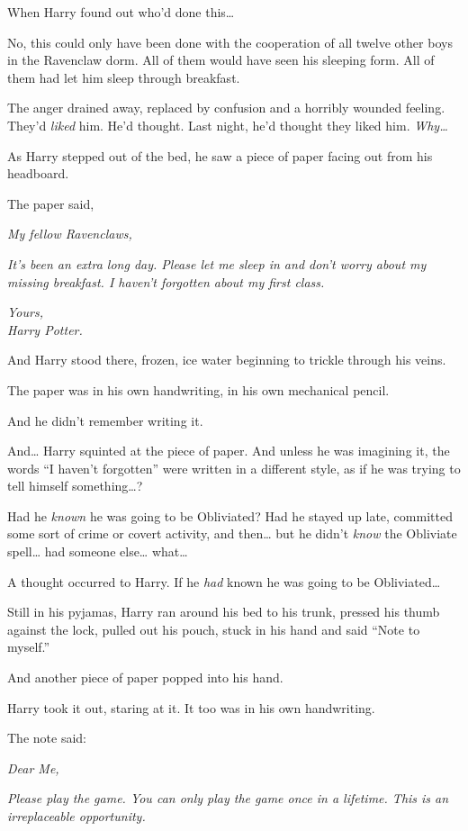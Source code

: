 When Harry found out who'd done this\ldots{}

No, this could only have been done with the cooperation of all twelve
other boys in the Ravenclaw dorm. All of them would have seen his
sleeping form. All of them had let him sleep through breakfast.

The anger drained away, replaced by confusion and a horribly wounded
feeling. They'd \emph{liked} him. He'd thought. Last night, he'd thought
they liked him. \emph{Why\ldots{}}

As Harry stepped out of the bed, he saw a piece of paper facing out from
his headboard.

The paper said,

\emph{My fellow Ravenclaws,}

\emph{It's been an extra long day. Please let me sleep in and don't
worry about my missing breakfast. I haven't forgotten about my first
class.}

\emph{Yours,}\\\emph{Harry Potter.}

And Harry stood there, frozen, ice water beginning to trickle through
his veins.

The paper was in his own handwriting, in his own mechanical pencil.

And he didn't remember writing it.

And\ldots{} Harry squinted at the piece of paper. And unless he was
imagining it, the words ``I haven't forgotten'' were written in a
different style, as if he was trying to tell himself something\ldots{}?

Had he \emph{known} he was going to be Obliviated? Had he stayed up
late, committed some sort of crime or covert activity, and then\ldots{}
but he didn't \emph{know} the Obliviate spell\ldots{} had someone
else\ldots{} what\ldots{}

A thought occurred to Harry. If he \emph{had} known he was going to be
Obliviated\ldots{}

Still in his pyjamas, Harry ran around his bed to his trunk, pressed his
thumb against the lock, pulled out his pouch, stuck in his hand and said
``Note to myself.''

And another piece of paper popped into his hand.

Harry took it out, staring at it. It too was in his own handwriting.

The note said:

\emph{Dear Me,}

\emph{Please play the game. You can only play the game once in a
lifetime. This is an irreplaceable opportunity.}

